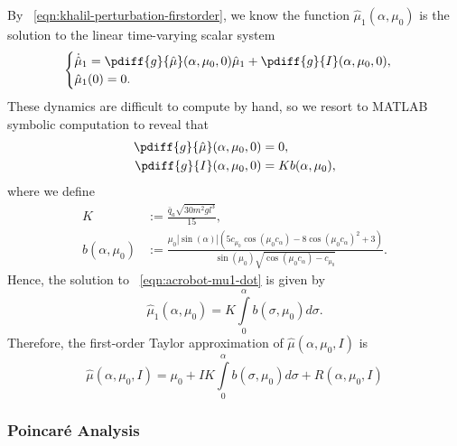 By ~\eqref{eqn:khalil-perturbation-firstorder}, we know the function
\(\hat{\mu}_1(\alpha,\mu_0)\) is the solution to the linear time-varying scalar
system
\begin{equation}\label{eqn:acrobot-mu1-dot}
    \begin{cases}
        \dot{\hat{\mu}}_1 = 
        \pdiff{g}{\hat{\mu}}(\alpha,\mu_0,0)\hat{\mu}_1 + \pdiff{g}{I}(\alpha, \mu_0, 0)
        , \\
        \hat{\mu}_1(0) = 0
        .
    \end{cases}
\end{equation}
These dynamics are difficult to compute by hand, so we resort to MATLAB symbolic
computation to reveal that
\begin{align*}
    \pdiff{g}{\hat{\mu}}(\alpha,\mu_0,0) &= 0
    , \\
    \pdiff{g}{I}(\alpha, \mu_0, 0) &= K b(\alpha,\mu_0)
    ,
\end{align*}
where we define
\begin{align*}
    K &:= \frac{\bar{q}_a \sqrt{30m^2g l^3}}{15}
    , \\
    b(\alpha,\mu_0) &:= \frac{
        \mu_0 |\sin(\alpha)| \left(
        5 c_{\mu_0} \cos(\mu_0 c_\alpha) - 8 \cos(\mu_0c_\alpha)^2 + 3
    \right)
    }{
    \sin(\mu_0)\sqrt{\cos(\mu_0c_\alpha) - c_{\mu_0}}
    }
    .
\end{align*}
Hence, the solution to ~\eqref{eqn:acrobot-mu1-dot} is given by
\[
    \hat{\mu}_1(\alpha,\mu_0) =
    K \int \limits_0^\alpha b(\sigma,\mu_0)d\sigma
    .
\]
Therefore, the first-order Taylor approximation of \(\hat{\mu}(\alpha,\mu_0,I)\) is
\begin{equation}\label{eqn:acrobot-muhat-expanded}
    \hat{\mu}(\alpha,\mu_0,I)
    = \mu_0 + I K \int \limits_0^\alpha b(\sigma,\mu_0)d\sigma +
    R(\alpha,\mu_0,I)
\end{equation}

\subsubsection{Poincar\'{e} Analysis}

